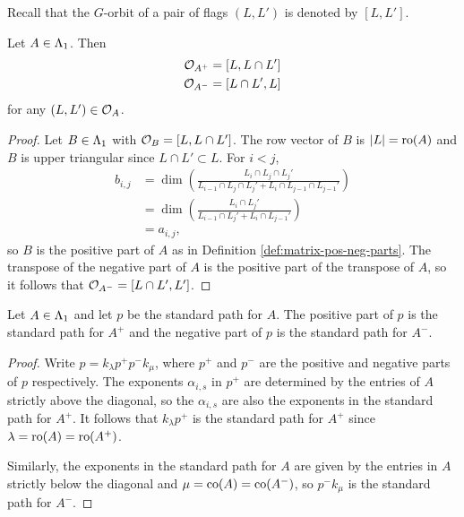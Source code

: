 \documentclass[a4paper, 11pt, twoside]{report}
\begin{document}
Recall that the $G$-orbit of a pair of flags $(L,L')$ is denoted by $[L,L']$.

\begin{lemma}\label{lemma:pos-neg-orbits}
Let $A\in\Lambda_1{}$. Then
\begin{align*}
\mathcal{O}_{A^+} &= [L,L\cap L']\\
\mathcal{O}_{A^-} &= [L\cap L',L]
\end{align*}
for any $(L,L')\in\mathcal{O}_{A}$.
\end{lemma}

\begin{proof}
Let $B\in\Lambda_1{}$ with $\mathcal{O}_{B} = [L,L\cap L']$. The row vector of $B$ is $|L|=\operatorname{ro}(A)$ and $B$ is upper triangular since $L\cap L'\subset L$. For $i<j$,
\begin{align*}
b_{i,j}
&= \dim\left(\frac{L_i\cap L_j\cap L_j'}{L_{i-1}\cap L_j\cap L_j' + L_i\cap L_{j-1}\cap L_{j-1}'}\right)\\
&= \dim\left(\frac{L_i\cap L_j'}{L_{i-1}\cap L_j' + L_i\cap L_{j-1}'}\right)\\
&= a_{i,j},
\end{align*}
so $B$ is the positive part of $A$ as in Definition \ref{def:matrix-pos-neg-parts}. The transpose of the negative part of $A$ is the positive part of the transpose of $A$, so it follows that $\mathcal{O}_{A^-}=[L\cap L',L']$.
\end{proof}

\begin{lemma}\label{lemma:pos-neg-path-to-matrix}
Let $A\in\Lambda_1{}$ and let $p$ be the standard path for $A$. The positive part of $p$ is the standard path for $A^+$ and the negative part of $p$ is the standard path for $A^-$.
\end{lemma}

\begin{proof}
Write $p=k_\lambda p^+ p^-k_\mu$, where $p^+$ and $p^-$ are the positive and negative parts of $p$ respectively. The exponents $\alpha_{i,s}$ in $p^+$ are determined by the entries of $A$ strictly above the diagonal, so the $\alpha_{i,s}$ are also the exponents in the standard path for $A^+$. It follows that $k_\lambda p^+$ is the standard path for $A^+$ since $\lambda=\operatorname{ro}(A)=\operatorname{ro}(A^+)$.

Similarly, the exponents in the standard path for $A$ are given by the entries in $A$ strictly below the diagonal and $\mu=\operatorname{co}(A)=\operatorname{co}(A^-)$, so $p^- k_\mu$ is the standard path for $A^-$.
\end{proof}
\end{document}
